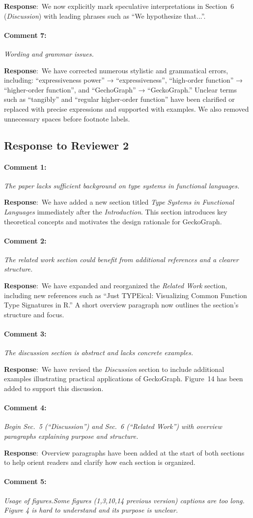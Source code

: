 \documentclass{article}
\newcommand{\pointRaised}[2]{\medskip \noindent 
               \paragraph{#1} \textsl{#2}}
\newcommand{\reply}{\noindent \textbf{Response}:\ }
\begin{document}
\reply We now explicitly mark speculative interpretations in Section~6 (\textit{Discussion}) with leading phrases such as “We hypothesize that...”.

\pointRaised{Comment 7:}{Wording and grammar issues.}

\reply We have corrected numerous stylistic and grammatical errors, including:
“expressiveness power” → “expressiveness”,
“high-order function” → “higher-order function”,
and “GechoGraph” → “GeckoGraph.”  
Unclear terms such as “tangibly” and “regular higher-order function” have been clarified or replaced with precise expressions and supported with examples.  
We also removed unnecessary spaces before footnote labels.

\subsection*{Response to Reviewer 2}

\pointRaised{Comment 1:}{The paper lacks sufficient background on type systems in functional languages.}

\reply We have added a new section titled \textit{Type Systems in Functional Languages} immediately after the \textit{Introduction}. This section introduces key theoretical concepts and motivates the design rationale for GeckoGraph.

\pointRaised{Comment 2:}{The related work section could benefit from additional references and a clearer structure.}

\reply We have expanded and reorganized the \textit{Related Work} section, including new references such as “Just TYPEical: Visualizing Common Function Type Signatures in R.” A short overview paragraph now outlines the section’s structure and focus.

\pointRaised{Comment 3:}{The discussion section is abstract and lacks concrete examples.}

\reply We have revised the \textit{Discussion} section to include additional examples illustrating practical applications of GeckoGraph. Figure~14 has been added to support this discussion.

\pointRaised{Comment 4:}{Begin Sec.~5 (“Discussion”) and Sec.~6 (“Related Work”) with overview paragraphs explaining purpose and structure.}

\reply Overview paragraphs have been added at the start of both sections to help orient readers and clarify how each section is organized.

\pointRaised{Comment 5:}{Usage of figures.Some figures (1,3,10,14 previous version) captions are too long. Figure 4 is hard to understand and its purpose is unclear.}
\end{document}
